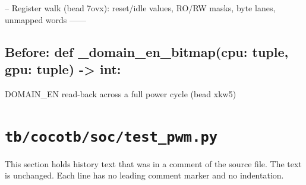 \begin{record}
\begin{textblock}
-- Register walk (bead 7ovx): reset/idle values, RO/RW masks, byte lanes, unmapped words ------
\end{textblock}

\subsection*{Before: def \_domain\_en\_bitmap(cpu: tuple, gpu: tuple) -> int:}

\begin{textblock}
DOMAIN_EN read-back across a full power cycle (bead xkw5)
\end{textblock}

\end{record}

\section{\texttt{tb/cocotb/soc/test\_pwm.py}}\label{cr:suite:soc-test-pwm}

This section holds history text that was in a comment of the source file. The text is unchanged. Each line has no leading comment marker and no indentation.

